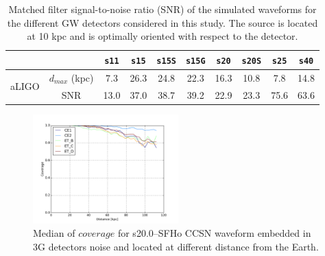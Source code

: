 \begin{table}
  \centering
  \begin{tabular}{c|c|cccccccc}
    
    
\multicolumn{2}{c|}{}  & \texttt{s11} & \texttt{s15} & \texttt{s15S} & \texttt{s15G} & \texttt{s20} & \texttt{s20S} & \texttt{s25}  & \texttt{s40}\\   

\hline
\multirow{2}{*}{aLIGO} & $d_{max}$ (kpc) & 7.3  & 26.3 & 24.8 & 22.3 & 16.3 & 10.8 & 7.8  & 14.8\\
\cline{2-10}
                       & SNR            & 13.0 & 37.0 & 38.7 & 39.2 & 22.9 & 23.3 & 75.6 & 63.6\\
\hline
\hline

  \end{tabular}
  \caption{%
    Matched filter signal-to-noise ratio (SNR) of the simulated waveforms for
    the different GW detectors considered in this study. The source is located
    at 10 kpc and is optimally oriented with respect to the detector.
  }
  \label{tab:results}
\end{table}

\begin{figure}
  \centering
  \includegraphics[width=0.5\textwidth]{plots/s20--SFHo_all3G}
  \caption{Median of $coverage$ for s20.0--SFHo CCSN waveform embedded in 3G detectors noise and located at different distance from the Earth. } \label{fig:s20--SFHo_all3G}
\end{figure}
